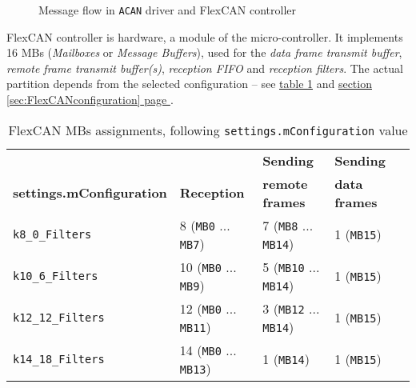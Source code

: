 \documentclass[9pt, a4paper, obeyspaces, openany]{extarticle}
\newcommand\refSectionPage[1]{\hyperref[sec:#1]{section \ref*{sec:#1} page \pageref{sec:#1}}}
\newcommand\labelTableau[1]{\label{tab:#1}}
\newcommand\refTableau[1]{\hyperref[tab:#1]{table \ref*{tab:#1}}}
\newcommand\labelFigure[1]{\label{fig:#1}}
\begin{document}
\begin{figure}[htbp]
  \caption{Message flow in \texttt{ACAN} driver and FlexCAN controller}
  \labelFigure{figureStructureStationCAN}
\end{figure}

FlexCAN controller is hardware, a module of the micro-controller. It implements 16 MBs (\emph{Mailboxes} or \emph{Message Buffers}), used for the \emph{data frame transmit buffer}, \emph{remote frame transmit buffer(s)}, \emph{reception FIFO} and \emph{reception filters}. The actual partition depends from the selected configuration -- see \refTableau{MBassignement} and \refSectionPage{FlexCANconfiguration}.



\begin{table}[htbp]
  \small
  \onehalfspacing
  \centering
  \begin{tabular}{lllll}
     & & \textbf{Sending} & \textbf{Sending} \\
    \textbf{settings.mConfiguration}& \textbf{Reception} & \textbf{remote frames} & \textbf{data frames} \\
    \texttt{k8\_0\_Filters} & 8 (\texttt{MB0} ... \texttt{MB7}) & 7 (\texttt{MB8} ... \texttt{MB14}) & 1 (\texttt{MB15})\\
    \texttt{k10\_6\_Filters} & 10  (\texttt{MB0} ... \texttt{MB9}) & 5  (\texttt{MB10} ... \texttt{MB14})& 1 (\texttt{MB15})\\
    \texttt{k12\_12\_Filters} & 12  (\texttt{MB0} ... \texttt{MB11}) & 3  (\texttt{MB12} ... \texttt{MB14}) & 1 (\texttt{MB15})\\
    \texttt{k14\_18\_Filters} & 14  (\texttt{MB0} ... \texttt{MB13}) & 1 (\texttt{MB14}) & 1 (\texttt{MB15})\\
  \end{tabular}
  \caption{FlexCAN MBs assignments, following \texttt{settings.mConfiguration} value}
  \labelTableau{MBassignement}
\end{table}
\end{document}
